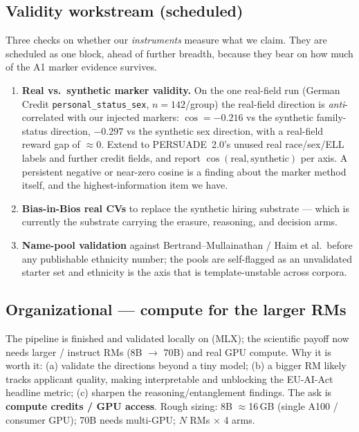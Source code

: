 \documentclass{article}
\begin{document}
\subsection{Validity workstream (scheduled)}
Three checks on whether our \emph{instruments} measure what we claim. They are scheduled as one block, ahead
of further breadth, because they bear on how much of the A1 marker evidence survives.
\begin{enumerate}
  \item \textbf{Real vs.\ synthetic marker validity.} On the one real-field run (German Credit
        \texttt{personal\_status\_sex}, $n{=}142$/group) the real-field direction is \emph{anti}-correlated
        with our injected markers: $\cos = -0.216$ vs the synthetic family-status direction, $-0.297$ vs the
        synthetic sex direction, with a real-field reward gap of $\approx 0$. Extend to PERSUADE~2.0's unused
        real race/sex/ELL labels and further credit fields, and report $\cos(\text{real},\text{synthetic})$
        per axis. A persistent negative or near-zero cosine is a finding about the marker method itself, and
        the highest-information item we have. 
  \item \textbf{Bias-in-Bios real CVs} to replace the synthetic hiring substrate --- which is currently the
        substrate carrying the erasure, reasoning, and decision arms.
  \item \textbf{Name-pool validation} against Bertrand--Mullainathan / Haim et al.\ before any publishable
        ethnicity number; the pools are self-flagged as an unvalidated starter set and ethnicity is the axis
        that is template-unstable across corpora.
\end{enumerate}

\subsection{Organizational --- compute for the larger RMs}
The pipeline is finished and validated locally on \modelSmall{} (MLX); the scientific payoff now needs
larger / instruct RMs (8B $\to$ 70B) and real GPU compute. Why it is worth it: (a) validate the directions
beyond a tiny model; (b) a bigger RM likely tracks applicant quality, making \crossinf{} interpretable and
unblocking the EU-AI-Act headline metric; (c) sharpen the reasoning/entanglement findings. The ask is
\textbf{compute credits / GPU access}. Rough sizing: 8B $\approx$16\,GB (single A100 / consumer GPU); 70B
needs multi-GPU; $N$ RMs $\times$ 4 arms.



\end{document}
